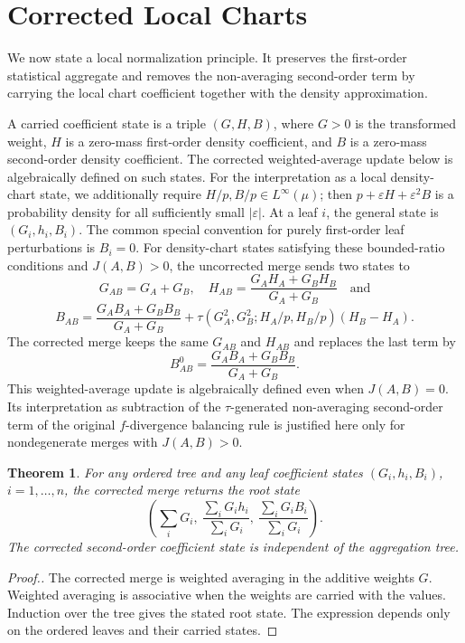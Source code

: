 \documentclass[11pt]{article}
\theoremstyle{plain}
\newtheorem{theorem}{Theorem}
\theoremstyle{definition}
\theoremstyle{definition}
\newcommand{\eps}{\varepsilon}
\begin{document}
\section{Corrected Local Charts}\label{sec:normalform}

We now state a local normalization principle. It preserves the first-order statistical aggregate and removes the non-averaging second-order term by carrying the local chart coefficient together with the density approximation.

A carried coefficient state is a triple $(G,H,B)$, where $G>0$ is the transformed weight, $H$ is a zero-mass first-order density coefficient, and $B$ is a zero-mass second-order density coefficient. The corrected weighted-average update below is algebraically defined on such states. For the interpretation as a local density-chart state, we additionally require $H/p,B/p\in L^\infty(\mu)$; then $p+\eps H+\eps^2B$ is a probability density for all sufficiently small $|\eps|$. At a leaf $i$, the general state is $(G_i,h_i,B_i)$. The common special convention for purely first-order leaf perturbations is $B_i=0$. For density-chart states satisfying these bounded-ratio conditions and $J(A,B)>0$, the uncorrected merge sends two states to
\[
G_{AB}=G_A+G_B,
\quad
H_{AB}=\frac{G_AH_A+G_BH_B}{G_A+G_B}\quad\text{and}
\]
\[
B_{AB}=\frac{G_AB_A+G_BB_B}{G_A+G_B}+\tau(G_A^2,G_B^2;H_A/p,H_B/p)(H_B-H_A).
\]
The corrected merge keeps the same $G_{AB}$ and $H_{AB}$ and replaces the last term by
\[
B_{AB}^{0}=\frac{G_AB_A+G_BB_B}{G_A+G_B}.
\]
This weighted-average update is algebraically defined even when $J(A,B)=0$. Its interpretation as subtraction of the $\tau$-generated non-averaging second-order term of the original $f$-divergence balancing rule is justified here only for nondegenerate merges with $J(A,B)>0$.

\begin{theorem}\label{thm:normalform}
For any ordered tree and any leaf coefficient states $(G_i,h_i,B_i)$, $i=1,\ldots,n$, the corrected merge returns the root state
\[
\left(\sum_iG_i,\ \frac{\sum_iG_ih_i}{\sum_iG_i},\ \frac{\sum_iG_iB_i}{\sum_iG_i}\right).
\]
The corrected second-order coefficient state is independent of the aggregation tree.
\end{theorem}

\begin{proof}[Proof.]
The corrected merge is weighted averaging in the additive weights $G$. Weighted averaging is associative when the weights are carried with the values. Induction over the tree gives the stated root state. The expression depends only on the ordered leaves and their carried states.
\end{proof}
\end{document}
